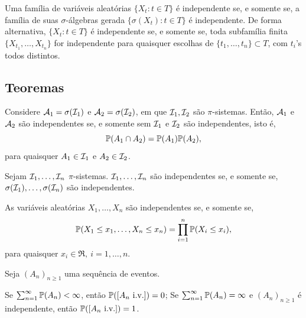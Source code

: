 \begin{definition}
	\leavevmode
	\begin{outline}
		\1 Uma família de variáveis aleatórias $\{X_t: t \in T\}$ é independente se, e somente se, a família de suas $\sigma$-álgebras gerada $\{\sigma(X_t): t \in T\}$ é independente.
		\1 De forma alternativa,  $\{X_t: t \in T\}$ é independente se, e somente se, toda subfamília finita $\{X_{t_1}, \ldots, X_{t_n}\}$ for independente para quaisquer escolhas de $\{t_1, \ldots, t_n\}\subset T$, com $t_i$'s todos distintos.
	\end{outline}
\end{definition}

\subsection{Teoremas}

\begin{theorem}
	Considere $\Acal_1 = \sigma(\Ical_1)$ e $\Acal_2 = \sigma(\Ical_2)$, em que $\Ical_1, \Ical_2$ são $\pi$-sistemas. Então, $\Acal_1$ e $\Acal_2$ são independentes se, e somente sem $\Ical_1$ e $\Ical_2$ são independentes, isto é, 
	\begin{equation}
		\P(A_1\cap A_2) = \P(A_1) \P(A_2),
	\end{equation}
	para quaisquer $A_1\in\Ical_1$ e $A_2\in\Ical_2$.
\end{theorem}

\begin{theorem}
	Sejam $\Ical_1, \ldots, \Ical_n$ $\pi$-sistemas. $\Ical_1, \ldots, \Ical_n$ são independentes se, e somente se, $\sigma(\Ical_1), \ldots, \sigma(\Ical_n)$ são independentes.
\end{theorem}

\begin{corollary}
	As variáveis aleatórias $X_1,\ldots, X_n$ são independentes se, e somente se,
	\begin{equation}
		\P(X_1\leq x_1, \ldots, X_n\leq x_n) = \prod_{i=1}^{n}\P(X_i\leq x_i),
	\end{equation}
	para quaisquer $x_i \in \Re, \ i=1,\ldots,n$.
\end{corollary}

\begin{theorem}
	Seja $(A_n)_{n\geq1}$ uma sequência de eventos.
	\begin{outline}[enumerate]
		\1 Se $\sum_{n=1}^{\infty}\P(A_n) < \infty$, então $\P([A_n \text{ i.v.}])=0$;
		\1 Se $\sum_{n=1}^{\infty}\P(A_n) = \infty$ e $(A_n)_{n\geq1}$ é independente, então $\P([A_n \text{ i.v.}])=1$.
	\end{outline}
\end{theorem}

